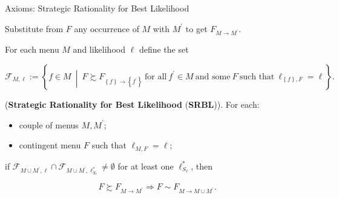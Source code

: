 \documentclass[usenames,dvipsnames,aspectratio=169,11pt,handout]{beamer}
\begin{document}
\begin{frame}{Axioms: Strategic Rationality for Best Likelihood}\label{srblapp}

	Substitute from \( F \) any occurrence of \( M \) with \( M^{\prime} \) to get \( F_{M \rightarrow M^{\prime}} \).

	\vfill

	For each menu \( M \) and likelihood \( \ell \) define the set

	\[
		\mathcal{F}_{M, \ell} := \left\{ f \in M \: \middle\vert \: F \succsim F_{\left\{ f \right\} \rightarrow \left\{ f^{\prime} \right\}} \: \text{for all} \: f^{\prime} \in M \: \text{and some} \: F \: \text{such that} \: \ell_{\left\{ f \right\}, F} = \ell \right\} .
	\]

	\begin{axiom}\label{ax:appsrbl}

		(\textbf{Strategic Rationality for Best Likelihood} (\textbf{SRBL})). For each:
		\begin{itemize}
			\item couple of menus \( M, M^{\prime} \);
			\item contingent menu \( F \) such that \( \ell_{M,F} = \ell \);
		\end{itemize}
		if \( \mathcal{F}_{M \cup M^{\prime}, \ell} \cap \mathcal{F}_{M \cup M^{\prime}, \ell^{*}_{S_{\ell}}} \neq \emptyset \) for at least one \( \ell_{S_{\ell}}^{*} \), then

		\[
			F \succsim F_{M \rightarrow M^{\prime}} \Rightarrow F \sim F_{M \rightarrow M \cup M^{\prime}} .
		\]

	\end{axiom}

	\begin{flushright}
		\hyperlink{srbl}{}
	\end{flushright}


\end{frame}
\end{document}
